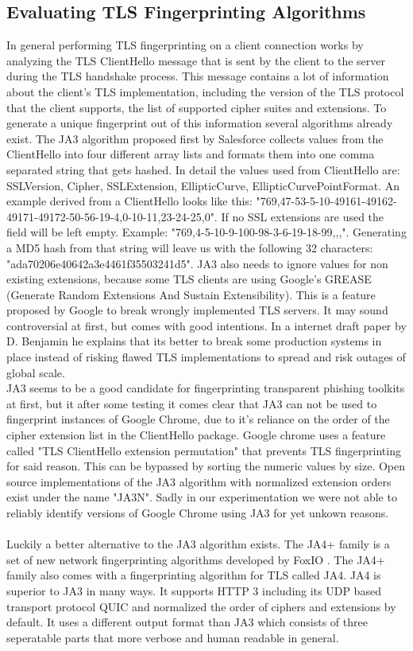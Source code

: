 \documentclass[12pt]{report}
\begin{document}
\subsection{Evaluating TLS Fingerprinting Algorithms}
In general performing TLS fingerprinting on a client connection works by analyzing the TLS ClientHello message that is sent by the client to the server during the TLS handshake process. This message contains a lot of information about the client's TLS implementation, including the version of the TLS protocol that the client supports, the list of supported cipher suites and extensions. To generate a unique fingerprint out of this information several algorithms already exist. The JA3 algorithm proposed first by Salesforce \cite{ja3Salesforce} collects values from the ClientHello into four different array lists and formats them into one comma separated string that gets hashed. In detail the values used from ClientHello are: SSLVersion, Cipher, SSLExtension, EllipticCurve, EllipticCurvePointFormat. An example derived from a ClientHello looks like this: "769,47-53-5-10-49161-49162-49171-49172-50-56-19-4,0-10-11,23-24-25,0". If no SSL extensions are used the field will be left empty. Example: "769,4-5-10-9-100-98-3-6-19-18-99,,,". Generating a MD5 hash from that string will leave us with the following 32 characters: "ada70206e40642a3e4461f35503241d5". JA3 also needs to ignore values for non existing extensions, because some TLS clients are using Google’s GREASE (Generate Random Extensions And Sustain Extensibility). This is a feature proposed by Google to break wrongly implemented TLS servers. It may sound controversial at first, but comes with good intentions. In a internet draft paper by D. Benjamin \cite{greaseDraft} he explains that its better to break some production systems in place instead of risking flawed TLS implementations to spread and risk outages of global scale.\\JA3 seems to be a good candidate for fingerprinting transparent phishing toolkits at first, but it after some testing it comes clear that JA3 can not be used to fingerprint instances of Google Chrome, due to it's reliance on the order of the cipher extension list in the ClientHello package. Google chrome uses a feature called "TLS ClientHello extension permutation" that prevents TLS fingerprinting for said reason. This can be bypassed by sorting the numeric values by size. Open source implementations of the JA3 algorithm with normalized extension orders exist under the name "JA3N". Sadly in our experimentation we were not able to reliably identify versions of Google Chrome using JA3 for yet unkown reasons.\\ \\
Luckily a better alternative to the JA3 algorithm exists. The JA4+ family is a set of new network fingerprinting algorithms developed by FoxIO \cite{foxIOJa4}.
The JA4+ family also comes with a fingerprinting algorithm for TLS called JA4. JA4 is superior to JA3 in many ways. It supports HTTP 3 including its UDP based transport protocol QUIC and normalized the order of ciphers and extensions by default. It uses a different output format than JA3 which consists of three seperatable parts that more verbose and human readable in general.
\end{document}
